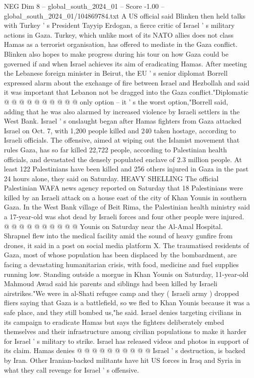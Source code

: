 \begin{textsample}{NEG Dim 8 – global\_south\_2024\_01 – Score -1.00 – global\_south\_2024\_01/104869784.txt}
A US official said Blinken then held talks with Turkey ' s President Tayyip Erdogan, a fierce critic of Israel ' s military actions in Gaza.
Turkey, which unlike most of its NATO allies does not class Hamas as a terrorist organisation, has offered to mediate in the Gaza conflict.
Blinken also hopes to make progress during his tour on how Gaza could be governed if and when Israel achieves its aim of eradicating Hamas.
After meeting the Lebanese foreign minister in Beirut, the EU ' s senior diplomat Borrell expressed alarm about the exchange of fire between Israel and Hezbollah and said it was important that Lebanon not be dragged into the Gaza conflict."Diplomatic @ @ @ @ @ @ @ @ @ @ only option -- it ' s the worst option,"Borrell said, adding that he was also alarmed by increased violence by Israeli settlers in the West Bank.
Israel ' s onslaught began after Hamas fighters from Gaza attacked Israel on Oct. 7, with 1,200 people killed and 240 taken hostage, according to Israeli officials.
The offensive, aimed at wiping out the Islamist movement that rules Gaza, has so far killed 22,722 people, according to Palestinian health officials, and devastated the densely populated enclave of 2.3 million people.
At least 122 Palestinians have been killed and 256 others injured in Gaza in the past 24 hours alone, they said on Saturday.
HEAVY SHELLING The official Palestinian WAFA news agency reported on Saturday that 18 Palestinians were killed by an Israeli attack on a house east of the city of Khan Younis in southern Gaza.
In the West Bank village of Beit Rima, the Palestinian health ministry said a 17-year-old was shot dead by Israeli forces and four other people were injured. @ @ @ @ @ @ @ @ @ @ Younis on Saturday near the Al-Amal Hospital.
Shrapnel flew into the medical facility amid the sound of heavy gunfire from drones, it said in a post on social media platform X.
The traumatised residents of Gaza, most of whose population has been displaced by the bombardment, are facing a devastating humanitarian crisis, with food, medicine and fuel supplies running low.
Standing outside a morgue in Khan Younis on Saturday, 11-year-old Mahmoud Awad said his parents and siblings had been killed by Israeli airstrikes."We were in al-Shati refugee camp and they ( Israeli army ) dropped fliers saying that Gaza is a battlefield, so we fled to Khan Younis because it was a safe place, and they still bombed us,"he said.
Israel denies targeting civilians in its campaign to eradicate Hamas but says the fighters deliberately embed themselves and their infrastructure among civilian populations to make it harder for Israel ' s military to strike.
Israel has released videos and photos in support of its claim.
Hamas denies @ @ @ @ @ @ @ @ @ @ Israel ' s destruction, is backed by Iran.
Other Iranian-backed militants have hit US forces in Iraq and Syria in what they call revenge for Israel ' s offensive.

\end{textsample}
